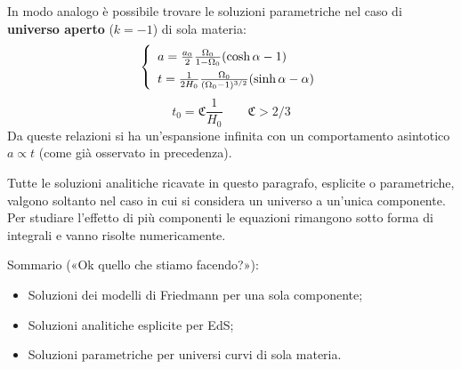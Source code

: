 \vspace{1em}
In modo analogo è possibile trovare le soluzioni parametriche nel caso di \textbf{universo aperto} ($k=-1$) di sola materia: 
\begin{equation}\left\{
\def\arraystretch{1.5}
    \begin{array}{ll}
    a=\frac{a_0}{2} \frac{\OmegaO}{1-\OmegaO}    (\cosh \alpha -1) \\
    t=\frac{1}{2H_0} \frac{\OmegaO}{(\OmegaO -1)^{3/2}}  (\sinh \alpha -\alpha)
\end{array}\right.
\end{equation}
\begin{equation}
t_0 = \mathfrak{C} \frac{1}{H_0}\qquad \mathfrak{C}> 2/3
\end{equation}
Da queste relazioni si ha un'espansione infinita con un comportamento asintotico $a\propto t $ (come già osservato in precedenza).

\vspace{1em}
\noindent Tutte le soluzioni analitiche ricavate in questo paragrafo, esplicite o parametriche, valgono soltanto nel caso in cui si considera un universo a un'unica componente. Per studiare l'effetto di più componenti le equazioni rimangono sotto forma di integrali e vanno risolte numericamente.

Sommario («Ok quello che stiamo facendo?»):
\begin{itemize}
    \item Soluzioni dei modelli di Friedmann per una sola componente;
    \item Soluzioni analitiche esplicite per EdS;
    \item Soluzioni parametriche per universi curvi di sola materia.
\end{itemize}

